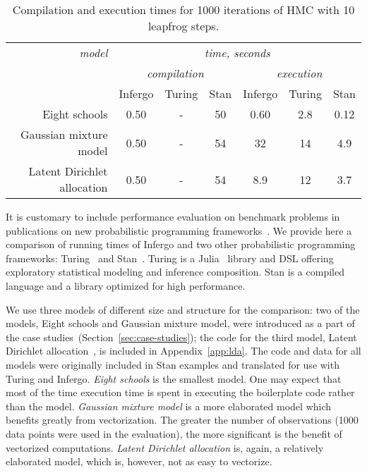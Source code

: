 \documentclass[sigplan,10pt,screen]{acmart}
\begin{document}
\begin{sloppypar}
\begin{table*}
  \begin{tabular}{r | c |  c | c | c | c | c | }
    {\it model}         & \multicolumn{6}{c|}{\it time, seconds} \\
                  & \multicolumn{3}{c|}{\it compilation} & \multicolumn{3}{c|}{\it execution} \\
                  & Infergo & Turing & Stan              & Infergo  & Turing & Stan    \\\hline
              Eight schools & 0.50    & -      & 50                & 0.60     & 2.8    & 0.12    \\
     Gaussian mixture model & 0.50    & -      & 54                & 32       & 14     & 4.9     \\
Latent Dirichlet allocation & 0.50    & -      & 54                & 8.9      & 12     & 3.7     \\
  \end{tabular}
\caption{Compilation and execution times for 1000 iterations
  of HMC with 10 leapfrog steps.}
\label{tab:memory-runtime}
\end{table*}
It is customary to include performance evaluation on benchmark
problems in publications on new probabilistic programming
frameworks~\cite{PW14,WVM14,TMY+16,GXG18}. We provide here a
comparison of running times of Infergo and two other probabilistic
programming frameworks: Turing~\cite{GXG18} and
Stan~\cite{Stan17}. Turing is a Julia~\cite{Julia14} library
and DSL offering exploratory statistical modeling  and
inference composition. Stan is a compiled language and a library
optimized for high performance.

We use three models of different size and structure for the
comparison: two of the models, Eight schools and Gaussian
mixture model, were introduced as a part of the case
studies~(Section~\ref{sec:case-studies}); the code for the third
model, Latent Dirichlet allocation~\cite{BNG03}, is included in
Appendix~\ref{app:lda}. The code and data for all models were
originally included in Stan examples and translated for use
with Turing and Infergo. \textit{Eight schools} is the smallest model.
One may expect that most of the time execution time is spent in
executing the boilerplate code rather than the model. \textit{Gaussian
mixture model} is a more elaborated model which benefits greatly
from vectorization. The greater the number of observations (1000
data points were used in the evaluation), the more significant
is the benefit of vectorized computations. \textit{Latent
Dirichlet allocation} is, again, a relatively elaborated model,
which is, however, not as easy to vectorize.


\end{sloppypar}
\end{document}
